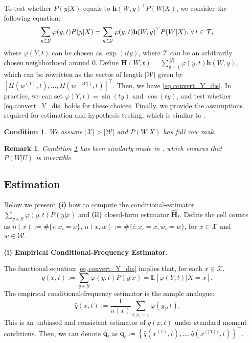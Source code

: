 \documentclass[
  12pt]{article}
\newtheorem{assumption}{Condition}
\newtheorem{remark}{Remark}
\def\H{\mathbf{H}}
\def\h{\mathbf{h}}
\def\q{\mathbf{q}}
\def\wh{\widehat}
\def\cT{\mathcal{T}}
\begin{document}
To test whether $P(y|X)$ equals to $\h(W,y)^\top P(W | X)$, we consider the following equation:
$$
\sum_{y\in\mathcal{Y}}\varphi(y,t)P(y|X)= \sum_{y\in\mathcal{Y}}\varphi(y,t)\h(W,y)^\top P(W|X). \ \forall \thinspace t \in \cT,
$$
where $\varphi(Y,t)$ can be chosen as $\exp(ity)$, where $\cT$ can be an arbitrarily chosen neighborhood around $0$. Define $\H(W,t)=\sum_{y=1}^{|\mathcal{Y}|}\varphi(y,t)\h(W,y)$, which can be rewritten as the vector of length $|\mathcal{W}|$ given by $[H(w^{(1)}, t), ..., H(w^{(|\mathcal{W}|)}, t)]^\top$. Then, we have \eqref{eq.convert_Y_dis}.
In practice, we can set $\varphi(Y,t) = \sin(ty)$ and $\cos(ty)$, and test whether \eqref{eq.convert_Y_dis} holds for these choices. Finally, we provide the assumptions required for estimation and hypothesis testing, which is similar to \cite{miao2018identifying}.
\begin{assumption}\label{ass:cardinality}
    We assume $|\mathcal{X}|>|\mathcal{W}|$ and $P(W|X)$ has full row rank.
\end{assumption}
\begin{remark}
    Condition \ref{ass:cardinality} has been similarly made in \cite{miao2018identifying}, which ensures that $P(W|U)$ is invertible.
\end{remark}

\subsection{Estimation}\label{sec:estimation}
Below we present \textbf{(i)} how to compute the conditional-estimator $\sum_{y \in \mathcal{Y}} \varphi(y, t) P(y | x)$ and \textbf{(ii)} closed-form estimator $\wh{\H}_t$. Define the cell counts as
$n(x) := \#\{i:x_i=x\}$, $n(x,w) := \#\{i:x_i=x, w_i=w\}$, for $x\in\mathcal{X}$ and $w\in\mathcal{W}$.

\noindent\textbf{(i) Empirical Conditional-Frequency Estimator.}

The functional equation \eqref{eq.convert_Y_dis} implies that, for each $x \in \mathcal{X}$,
$$
q(x,t) := \sum_{y \in \mathcal{Y}} \varphi(y, t) P(y | x) = \mathbb{E}[\varphi(Y, t) | X = x].
$$
The empirical conditional-frequency estimator is the sample analogue:
$$
\wh{q}(x,t) :=  \frac{1}{n(x)} \sum_{i:x_i=x} \varphi(y_i,t).
$$
This is an unbiased and consistent estimator of $q(x,t)$ under standard moment conditions. Then, we can denote $\wh{\q}_t$ as $\wh{\q}_t := \left\{ \wh{q}(x^{(1)},t), ..., \wh{q}\left(x^{(|\mathcal{X}|)},t \right) \right\}^\top$. 
\end{document}
